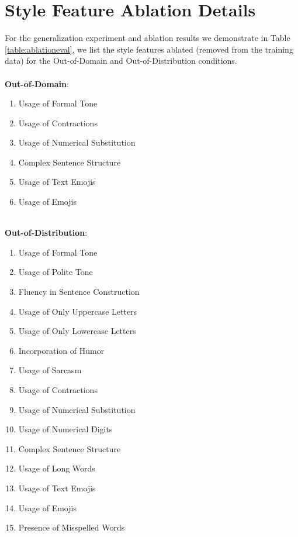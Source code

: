 \newpage
\section{Style Feature Ablation Details}
\label{sec:appendix:ablationdetails}

For the generalization experiment and ablation results we demonstrate in Table \ref{table:ablationeval}, we list the style features ablated (removed from the training data) for the Out-of-Domain and Out-of-Distribution conditions.
\\~\\
\noindent \textbf{Out-of-Domain}:
\begin{enumerate}
    \item Usage of Formal Tone
    \item Usage of Contractions
    \item Usage of Numerical Substitution
    \item Complex Sentence Structure
    \item Usage of Text Emojis
    \item Usage of Emojis
\end{enumerate}
~\\
\noindent \textbf{Out-of-Distribution}:
\begin{enumerate}
    \item Usage of Formal Tone
    \item Usage of Polite Tone
    \item Fluency in Sentence Construction
    \item Usage of Only Uppercase Letters
    \item Usage of Only Lowercase Letters
    \item Incorporation of Humor
    \item Usage of Sarcasm
    \item Usage of Contractions
    \item Usage of Numerical Substitution
    \item Usage of Numerical Digits
    \item Complex Sentence Structure
    \item Usage of Long Words
    \item Usage of Text Emojis
    \item Usage of Emojis
    \item Presence of Misspelled Words
\end{enumerate}